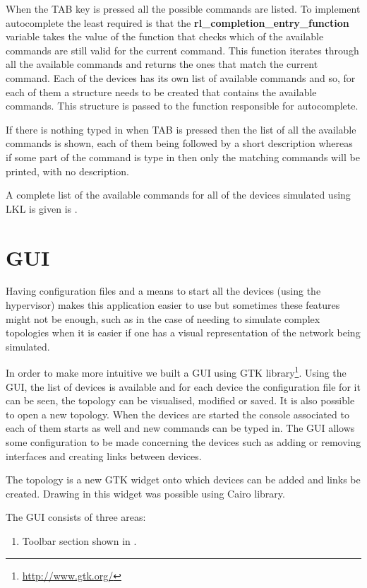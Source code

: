 {{When the TAB key is pressed all the possible commands are listed. To implement autocomplete the least required 
is that the \textbf{rl_completion_entry_function} variable takes the value of the function that checks which 
of the available commands are still valid for the current command. This function iterates through all 
the available commands and returns the ones that match the current command. Each of the devices has its own 
list of available commands and so, for each of them a structure needs to be created that contains the 
available commands. This structure is passed to the function responsible for autocomplete. 

If there is nothing typed in when TAB is pressed then the list of all the available commands is shown, 
each of them being followed by a short description whereas if some part of the command is type in then only 
the matching commands will be printed, with no description.

A complete list of the available commands for all of the devices simulated using LKL is given is .

\section{GUI}
\label{sec:gui}
Having configuration files and a means to start all the devices (using the hypervisor) makes this application 
easier to use but sometimes these features might not be enough, such as in the case of needing to simulate complex 
topologies when it is easier if one has a visual representation of the network being simulated.

In order to make \project more intuitive we built a GUI using GTK library\footnote{\url{http://www.gtk.org/}}. 
Using the GUI, the list of devices is available and for each device the configuration file for it can be seen, 
the topology can be visualised, modified or saved. It is also possible to open a new topology. When the devices 
are started the console associated to each of them starts as well and new commands can be typed in. The GUI 
allows some configuration to be made concerning the devices such as adding or removing interfaces and creating 
links between devices.

The topology is a new GTK widget onto which devices can be added and links be created. Drawing in this widget was possible using Cairo library.

The GUI consists of three areas:
\begin{enumerate}
\item Toolbar section shown in .


\end{enumerate}}}
